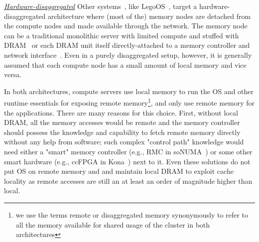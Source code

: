 
\vspace{3pt}
\noindent \uline{\textit{Hardware-disaggregated}}
Other systems~\cite{kona,aifm,fastswap,semeru}, like LegoOS~\cite{legoos}, target a hardware-disaggregated 
architecture where (most of the) 
memory nodes are detached from the compute nodes and 
made available through the network. The memory node 
can be a traditional monolithic server with limited 
compute and stuffed with DRAM~\cite{fastswap} or 
each DRAM unit itself directly-attached to a memory 
controller and network interface~\cite{legoos}. 
Even in a purely disaggregated setup, however, 
it is generally assumed that each compute node has 
a small amount of local memory and vice 
versa.~\cite{legoos,kona}



In both architectures, compute servers use local memory 
to run the OS and other runtime essentials for exposing remote 
memory\footnote{we use the terms remote or disaggregated 
memory synonymously to refer to all the memory 
available for shared usage of the cluster in both 
architectures}, and only use remote memory for the applications. 
There are many reasons for this choice. 
First, without local DRAM, all the memory 
accesses would be remote and the memory controller should 
possess the knowledge and capability to fetch remote memory 
directly without any help from software; such complex "control 
path" knowledge would need either a "smart" memory controller 
(e.g., RMC in soNUMA~\cite{sonuma}) or some other smart 
hardware (e.g., ccFPGA in Kona~\cite{kona}) next to it. 
Even these solutions do not put OS on remote memory and 
and maintain local DRAM to exploit cache locality as remote 
accesses are still an at least an order of magnitude higher 
than local.

